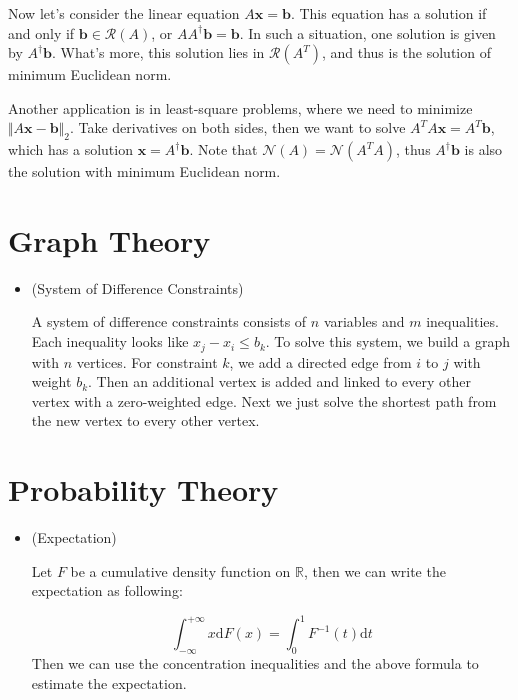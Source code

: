 \documentclass{article}
\begin{document}
\begin{itemize}
Now let's consider the linear equation $A\mathbf{x}=\mathbf{b}$. This equation has a solution if and only if $\mathbf{b}\in\mathcal{R}(A)$, or $AA^{\dagger}\mathbf{b}=\mathbf{b}$. In such a situation, one solution is given by $A^{\dagger}\mathbf{b}$. What's more, this solution lies in $\mathcal{R}(A^T)$, and thus is the solution of minimum Euclidean norm.

Another application is in least-square problems, where we need to minimize $\Vert A\mathbf{x}-\mathbf{b}\Vert_2$. Take derivatives on both sides, then we want to solve $A^TA\mathbf{x}=A^T\mathbf{b}$, which has a solution $\mathbf{x}=A^{\dagger}\mathbf{b}$. Note that $\mathcal{N}(A)=\mathcal{N}(A^TA)$, thus $A^{\dagger}\mathbf{b}$ is also the solution with minimum Euclidean norm.

\end{itemize}

\section{Graph Theory}

\begin{itemize}

\item (System of Difference Constraints)

A system of difference constraints consists of $n$ variables and $m$ inequalities. Each inequality looks like $x_j-x_i\le b_k$. To solve this system, we build a graph with $n$ vertices. For constraint $k$, we add a directed edge from $i$ to $j$ with weight $b_k$. Then an additional vertex is added and linked to every other vertex with a zero-weighted edge. Next we just solve the shortest path from the new vertex to every other vertex.

\end{itemize}

\section{Probability Theory}

\begin{itemize}

\item (Expectation)

Let $F$ be a cumulative density function on $\mathbb{R}$, then we can write the expectation as following:

\begin{equation}
\int_{-\infty}^{+\infty}x\mathrm{d}F(x)=\int_0^1F^{-1}(t)\mathrm{d}t
\end{equation}
Then we can use the concentration inequalities and the above formula to estimate the expectation.

\end{itemize}
\end{document}

